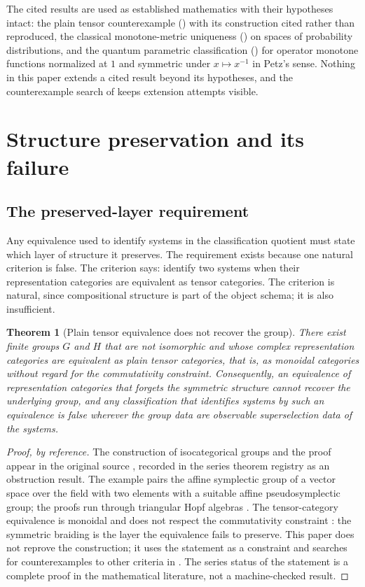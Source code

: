 \documentclass[11pt,letterpaper]{article}
\newtheorem{theorem}{Theorem}[section]
\theoremstyle{definition}
\theoremstyle{remark}
\begin{document}
The cited results are used as established mathematics with their hypotheses intact: the plain tensor counterexample () with its construction cited rather than reproduced, the classical monotone-metric uniqueness () on spaces of probability distributions, and the quantum parametric classification () for operator monotone functions normalized at $1$ and symmetric under $x \mapsto x^{-1}$ in Petz's sense. Nothing in this paper extends a cited result beyond its hypotheses, and the counterexample search of  keeps extension attempts visible.

\section{Structure preservation and its failure}
\label{sec:eg}

\subsection{The preserved-layer requirement}

Any equivalence used to identify systems in the classification quotient must state which layer of structure it preserves. The requirement exists because one natural criterion is false. The criterion says: identify two systems when their representation categories are equivalent as tensor categories. The criterion is natural, since compositional structure is part of the object schema; it is also insufficient.

\begin{theorem}[Plain tensor equivalence does not recover the group]
\label{thm:eg}
There exist finite groups $G$ and $H$ that are not isomorphic and whose complex representation categories are equivalent as plain tensor categories, that is, as monoidal categories without regard for the commutativity constraint. Consequently, an equivalence of representation categories that forgets the symmetric structure cannot recover the underlying group, and any classification that identifies systems by such an equivalence is false wherever the group data are observable superselection data of the systems.
\end{theorem}

\begin{proof}[Proof, by reference]
The construction of isocategorical groups and the proof appear in the original source \cite{b2}, recorded in the series theorem registry as an obstruction result. The example pairs the affine symplectic group of a vector space over the field with two elements with a suitable affine pseudosymplectic group; the proofs run through triangular Hopf algebras \cite{b2}. The tensor-category equivalence is monoidal and does not respect the commutativity constraint \cite{b2}: the symmetric braiding is the layer the equivalence fails to preserve. This paper does not reprove the construction; it uses the statement as a constraint and searches for counterexamples to other criteria in . The series status of the statement is a complete proof in the mathematical literature, not a machine-checked result.
\end{proof}
\end{document}
